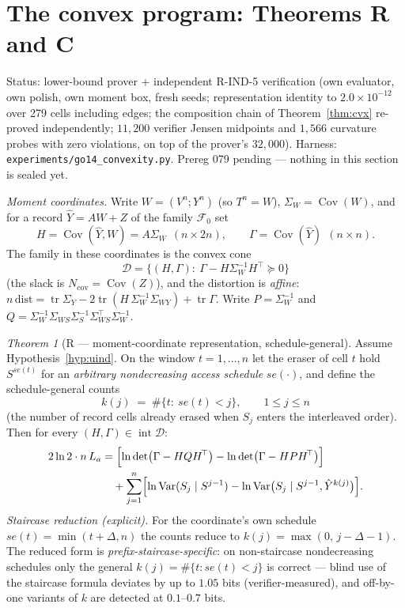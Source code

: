 \documentclass[11pt]{article}
\theoremstyle{definition}
\theoremstyle{remark}
\newtheorem{namedthm}{Theorem}
\begin{document}
\section{The convex program: Theorems R and C}
\label{sec:convex}
Status: lower-bound prover + independent R-IND-5 verification (own
evaluator, own polish, own moment box, fresh seeds; representation
identity to $2.0\times10^{-12}$ over 279 cells including edges; the
composition chain of Theorem~\ref{thm:cvx} re-proved independently;
$11{,}200$ verifier Jensen midpoints and $1{,}566$ curvature probes
with zero violations, on top of the prover's $32{,}000$). Harness:
\texttt{experiments/\allowbreak go14\_convexity.py}. Prereg 079
pending --- nothing in this section is sealed yet.

\emph{Moment coordinates.} Write $W=(V^n;Y^n)$ (so $T^n=W$),
$\Sigma_W=\operatorname{Cov}(W)$, and for a record $\hat Y=AW+Z$ of
the family $\mathcal F_0$ set
\[
H=\operatorname{Cov}(\hat Y,W)=A\Sigma_W\ \ (n\times2n),\qquad
\Gamma=\operatorname{Cov}(\hat Y)\ \ (n\times n).
\]
The family in these coordinates is the convex cone
\[
\mathcal D=\{(H,\Gamma):\ \Gamma-H\Sigma_W^{-1}H^{\!\top}\succeq0\}
\]
(the slack is $N_{\mathrm{cov}}=\operatorname{Cov}(Z)$), and the
distortion is \emph{affine}:
$n\,\mathrm{dist}=\operatorname{tr}\Sigma_Y
-2\operatorname{tr}(H\,\Sigma_W^{-1}\Sigma_{WY})
+\operatorname{tr}\Gamma$. Write $P=\Sigma_W^{-1}$ and
$Q=\Sigma_W^{-1}\Sigma_{WS}\Sigma_S^{-1}\Sigma_{WS}^{\!\top}
\Sigma_W^{-1}$.

\begin{namedthm}[R --- moment-coordinate representation,
schedule-general]
\label{thm:repr}
Assume Hypothesis~\ref{hyp:uind}. On the window $t=1,\dots,n$ let the
eraser of cell $t$ hold $S^{se(t)}$ for an \emph{arbitrary
nondecreasing access schedule} $se(\cdot)$, and define the
schedule-general counts
\[
k(j)\;=\;\#\{t:\ se(t)<j\},\qquad 1\le j\le n
\]
(the number of record cells already erased when $S_j$ enters the
interleaved order). Then for every $(H,\Gamma)\in
\operatorname{int}\mathcal D$:
\begin{align*}
2\ln2\cdot n\,L_a
&=\Bigl[\ln\det\bigl(\Gamma-HQH^{\!\top}\bigr)
      -\ln\det\bigl(\Gamma-HPH^{\!\top}\bigr)\Bigr]\\
&\quad+\sum_{j=1}^{n}\Bigl[\ln\operatorname{Var}(S_j\mid S^{j-1})
      -\ln\operatorname{Var}\bigl(S_j\mid S^{j-1},\hat Y^{k(j)}
      \bigr)\Bigr].
\end{align*}
\emph{Staircase reduction (explicit).} For the coordinate's own
schedule $se(t)=\min(t+\Delta,n)$ the counts reduce to
$k(j)=\max(0,\,j-\Delta-1)$. The reduced form is
\emph{prefix-staircase-specific}: on non-staircase nondecreasing
schedules only the general $k(j)=\#\{t: se(t)<j\}$ is correct ---
blind use of the staircase formula deviates by up to $1.05$ bits
(verifier-measured), and off-by-one variants of $k$ are detected at
$0.1$--$0.7$ bits.
\end{namedthm}
\end{document}
